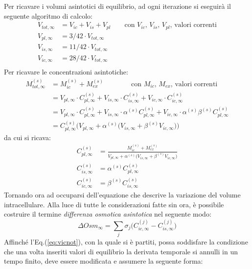 Per ricavare i volumi asintotici di equilibrio, ad ogni iterazione si eseguirà il seguente algoritmo di calcolo:
\begin{align}
		V_{tot,\infty}      &= V_{ic}+V_{is}+V_{pl}   \qquad \text{con $V_{ic}$, $V_{is}$, $V_{pl}$, valori correnti}\\
		V_{pl,\infty}       &= 3/42  \cdot V_{tot,\infty} \\
		V_{is,\infty}       &= 11/42 \cdot V_{tot,\infty} \\
		V_{ic,\infty}       &= 28/42 \cdot V_{tot,\infty} \\
\end{align}
Per ricavare le concentrazioni asintotiche:
\begin{align*}
		M_{tot,\infty}^{(s)} &= M_{ic}^{(s)}+M_{ex}^{(s)} \qquad\qquad \text{con $M_{ic}$, $M_{ex}$, valori correnti}\\
		                     &= V_{pl,\infty}\cdot C_{pl,\infty}^{(s)} + V_{is,\infty}\cdot C_{is,\infty}^{(s)}  + V_{ic,\infty}\cdot C_{ic,\infty}^{(s)} \\
		                     &= V_{pl,\infty}\cdot C_{pl,\infty}^{(s)} + V_{is,\infty}\cdot\alpha^{(s)}C_{pl,\infty}^{(s)}  + V_{ic,\infty}\cdot\alpha^{(s)}\beta^{(s)}C_{pl,\infty}^{(s)}   \\
		                     &= C_{pl,\infty}^{(s)} \biggl(V_{pl,\infty} + \alpha^{(s)}\bigl(V_{is,\infty} + \beta^{(s)}V_{ic,\infty}\bigr)\biggr)
\end{align*}
da cui si ricava:
\begin{align}
		C_{pl,\infty}^{(s)} &= \frac{M_{ic}^{(s)}+M_{ex}^{(s)}}{V_{pl,\infty} + \alpha^{(s)}\bigl(V_{is,\infty} + \beta^{(s)}V_{ic,\infty}\bigr)} \\
		C_{is,\infty}^{(s)} &= \alpha^{(s)} C_{pl,\infty}^{(s)} \\
		C_{ic,\infty}^{(s)} &= \beta^{(s)}  C_{is,\infty}^{(s)} 
\end{align}
\newline
\indent
Tornando ora ad occuparsi dell'equazione che descrive la variazione del volume intracellulare. Alla luce di tutte le considerazioni fatte sin ora, è possibile costruire il termine \textit{differenza osmotica asintotica} nel seguente modo:
\begin{equation}
	\Delta Osm_{\infty} = \sum_j{\sigma_j\bigl(C_{ic,\infty}^{(j)}-C_{is,\infty}^{(j)}\bigr)}
\end{equation}
Affinché l'Eq.(\ref{eq:vicnot}), con la quale si è partiti, possa soddisfare la condizione che una volta inseriti valori di equilibrio la derivata temporale si annulli in un tempo finito, deve essere modificata e assumere la seguente forma:

